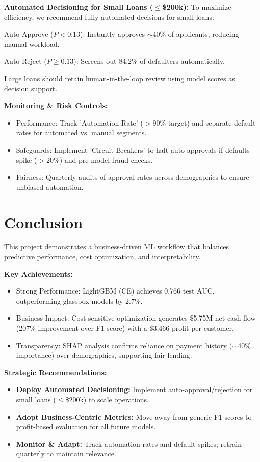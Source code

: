 \documentclass[12pt]{article}
\begin{document}
\textbf{Automated Decisioning for Small Loans ($\leq$\$200k):}
To maximize efficiency, we recommend fully automated decisions for small loans:

Auto-Approve ($P < 0.13$): Instantly approves $\sim$40\% of applicants, reducing manual workload.

Auto-Reject ($P \geq 0.13$): Screens out 84.2\% of defaulters automatically.

Large loans should retain human-in-the-loop review using model scores as decision support.

\textbf{Monitoring \& Risk Controls:}
\begin{itemize}
    \item Performance: Track 'Automation Rate' ($>$90\% target) and separate default rates for automated vs. manual segments.
    \item Safeguards: Implement 'Circuit Breakers' to halt auto-approvals if defaults spike ($>$20\%) and pre-model fraud checks.
    \item Fairness: Quarterly audits of approval rates across demographics to ensure unbiased automation.
\end{itemize}

\section{Conclusion}

This project demonstrates a business-driven ML workflow that balances predictive performance, cost optimization, and interpretability.

\textbf{Key Achievements:}
\begin{itemize}
    \item Strong Performance: LightGBM (CE) achieves 0.766 test AUC, outperforming glassbox models by 2.7\%.
    \item Business Impact: Cost-sensitive optimization generates \$5.75M net cash flow (207\% improvement over F1-score) with a \$3,466 profit per customer.
    \item Transparency: SHAP analysis confirms reliance on payment history ($\sim$40\% importance) over demographics, supporting fair lending.
\end{itemize}

\textbf{Strategic Recommendations:}
\begin{itemize}
    \item \textbf{Deploy Automated Decisioning:} Implement auto-approval/rejection for small loans ($\leq$\$200k) to scale operations.
    \item \textbf{Adopt Business-Centric Metrics:} Move away from generic F1-scores to profit-based evaluation for all future models.
    \item \textbf{Monitor \& Adapt:} Track automation rates and default spikes; retrain quarterly to maintain relevance.
\end{itemize}
\end{document}
